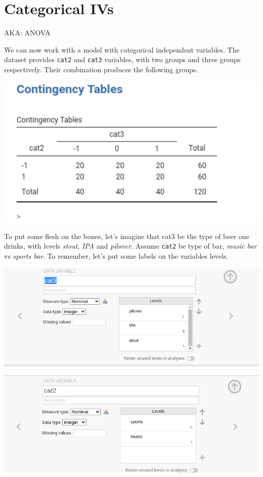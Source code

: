 \documentclass[
]{book}
\begin{document}
\hypertarget{anova}{%
\section{Categorical IVs}\label{anova}}

\begin{flushright} AKA: ANOVA  \end{flushright}

We can now work with a model with categorical independent variables. The dataset provides \texttt{cat2} and \texttt{cat3} variables, with two groups and three groups respectively. Their combination produces the following groups.

\includegraphics[width=5.65in]{bookletpics/2_anova_output1}

To put some flesh on the bones, let's imagine that cat3 be the type of beer one drinks, with levels \emph{stout}, \emph{IPA} and \emph{pilsner}. Assume \texttt{cat2} be type of bar, \emph{music bar} vs \emph{sports bar}. To remember, let's put some labels on the variables levels.

\includegraphics[width=10.74in]{bookletpics/2_anova_input1}

\includegraphics[width=10.46in]{bookletpics/2_anova_input2}
\end{document}
